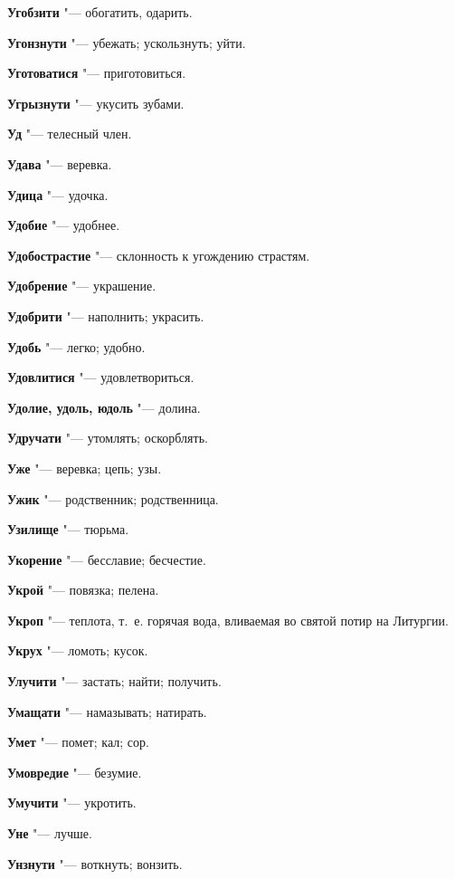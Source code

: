 \begin{mymulticols}
\noindent\textbf{Угобзити} "--- обогатить, одарить. 

\noindent\textbf{Угонзнути} "--- убежать; ускользнуть; уйти. 

\noindent\textbf{Уготоватися} "--- приготовиться. 

\noindent\textbf{Угрызнути} "--- укусить зубами. 

\noindent\textbf{Уд} "--- телесный член. 

\noindent\textbf{Удава} "--- веревка. 

\noindent\textbf{Удица} "--- удочка. 

\noindent\textbf{Удобие} "--- удобнее. 

\noindent\textbf{Удобострастие} "--- склонность к угождению страстям. 

\noindent\textbf{Удобрение} "--- украшение. 

\noindent\textbf{Удобрити} "--- наполнить; украсить. 

\noindent\textbf{Удобь} "--- легко; удобно. 

\noindent\textbf{Удовлитися} "--- удовлетвориться. 

\noindent\textbf{Удолие, удоль, юдоль} "--- долина. 

\noindent\textbf{Удручати} "--- утомлять; оскорблять. 

\noindent\textbf{Уже} "--- веревка; цепь; узы. 

\noindent\textbf{Ужик} "--- родственник; родственница. 

\noindent\textbf{Узилище} "--- тюрьма. 

\noindent\textbf{Укорение} "--- бесславие; бесчестие. 

\noindent\textbf{Укрой} "--- повязка; пелена. 

\noindent\textbf{Укроп} "--- теплота, т.~е. горячая вода, вливаемая во святой потир на Литургии. 

\noindent\textbf{Укрух} "--- ломоть; кусок. 

\noindent\textbf{Улучити} "--- застать; найти; получить. 

\noindent\textbf{Умащати} "--- намазывать; натирать. 

\noindent\textbf{Умет} "--- помет; кал; сор. 

\noindent\textbf{Умовредие} "--- безумие. 

\noindent\textbf{Умучити} "--- укротить. 

\noindent\textbf{Уне} "--- лучше. 

\noindent\textbf{Унзнути} "--- воткнуть; вонзить. 


\end{mymulticols}
